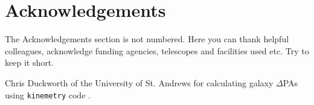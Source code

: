 \section*{Acknowledgements} %

The Acknowledgements section is not numbered. Here you can thank helpful colleagues, acknowledge funding agencies, telescopes and facilities used etc. Try to keep it short.
\par Chris Duckworth of the University of St. Andrews for calculating galaxy $\Delta$PAs using \texttt{kinemetry} code \citep{2011MNRAS.414.2923K}.
